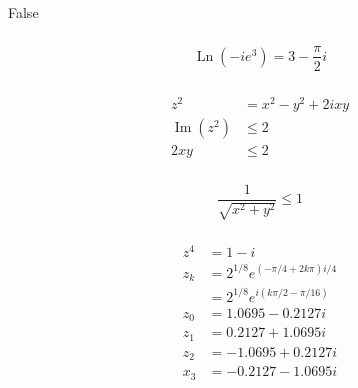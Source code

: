 \documentclass{article}
\renewcommand{\Im}{\operatorname{Im}}
\newcommand{\Ln}{\operatorname{Ln}}
\begin{document}
False

\setcounter{subsubsection}{14}
\subsubsection{}

\[\Ln (-i e^3) = 3 - \frac{\pi}{2} i\]

\setcounter{subsubsection}{20}
\subsubsection{}

\begin{align*}
  z^2       & = x^2 - y^2 + 2 i x y \\
  \Im (z^2) & \le 2                 \\
  2 x y     & \le 2
\end{align*}

\setcounter{subsubsection}{22}
\subsubsection{}

\[\frac{1}{\sqrt{x^2 + y^2}} \le 1\]

\setcounter{subsubsection}{26}
\subsubsection{}

\begin{align*}
  z^4 & = 1 - i                                    \\
  z_k & = 2^{1 / 8} e^{(-\pi / 4 + 2 k \pi) i / 4} \\
      & = 2^{1 / 8} e^{i (k \pi / 2 - \pi / 16)}   \\
  z_0 & = 1.0695 - 0.2127 i                        \\
  z_1 & = 0.2127 + 1.0695 i                        \\
  z_2 & = -1.0695 + 0.2127 i                       \\
  x_3 & = -0.2127 - 1.0695 i
\end{align*}
\end{document}
